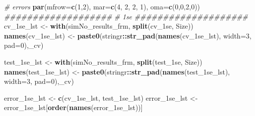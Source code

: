 \documentclass[
]{book}
\newenvironment{Shaded}{\begin{snugshade}}{\end{snugshade}}
\newcommand{\CommentTok}[1]{\textcolor[rgb]{0.56,0.35,0.01}{\textit{#1}}}
\newcommand{\DataTypeTok}[1]{\textcolor[rgb]{0.13,0.29,0.53}{#1}}
\newcommand{\DecValTok}[1]{\textcolor[rgb]{0.00,0.00,0.81}{#1}}
\newcommand{\KeywordTok}[1]{\textcolor[rgb]{0.13,0.29,0.53}{\textbf{#1}}}
\newcommand{\NormalTok}[1]{#1}
\newcommand{\OperatorTok}[1]{\textcolor[rgb]{0.81,0.36,0.00}{\textbf{#1}}}
\newcommand{\StringTok}[1]{\textcolor[rgb]{0.31,0.60,0.02}{#1}}
\begin{document}
\begin{Shaded}
\begin{Highlighting}[]
\CommentTok{\# errors}
\KeywordTok{par}\NormalTok{(}\DataTypeTok{mfrow=}\KeywordTok{c}\NormalTok{(}\DecValTok{1}\NormalTok{,}\DecValTok{2}\NormalTok{), }\DataTypeTok{mar=}\KeywordTok{c}\NormalTok{(}\DecValTok{4}\NormalTok{, }\DecValTok{2}\NormalTok{, }\DecValTok{2}\NormalTok{, }\DecValTok{1}\NormalTok{), }\DataTypeTok{oma=}\KeywordTok{c}\NormalTok{(}\DecValTok{0}\NormalTok{,}\DecValTok{0}\NormalTok{,}\DecValTok{2}\NormalTok{,}\DecValTok{0}\NormalTok{))}
\CommentTok{\#\#\#\#\#\#\#\#\#\#\#\#\#\#\#\#\#\#\#}
\CommentTok{\# 1se}
\CommentTok{\#\#\#\#\#\#\#\#\#\#\#\#\#\#\#\#\#\#\#\#}
\NormalTok{cv\_1se\_lst <{-}}\StringTok{ }\KeywordTok{with}\NormalTok{(simNo\_results\_frm,}
 \KeywordTok{split}\NormalTok{(cv\_1se, Size))}
\KeywordTok{names}\NormalTok{(cv\_1se\_lst) <{-}}\StringTok{ }\KeywordTok{paste0}\NormalTok{(stringr}\OperatorTok{::}\KeywordTok{str\_pad}\NormalTok{(}\KeywordTok{names}\NormalTok{(cv\_1se\_lst), }\DataTypeTok{width=}\DecValTok{3}\NormalTok{, }\DataTypeTok{pad=}\StringTok{\textquotesingle{}0\textquotesingle{}}\NormalTok{),}\StringTok{\textquotesingle{}\_cv\textquotesingle{}}\NormalTok{)}

\NormalTok{test\_1se\_lst <{-}}\StringTok{ }\KeywordTok{with}\NormalTok{(simNo\_results\_frm,}
 \KeywordTok{split}\NormalTok{(test\_1se, Size))}
\KeywordTok{names}\NormalTok{(test\_1se\_lst) <{-}}\StringTok{ }\KeywordTok{paste0}\NormalTok{(stringr}\OperatorTok{::}\KeywordTok{str\_pad}\NormalTok{(}\KeywordTok{names}\NormalTok{(test\_1se\_lst), }\DataTypeTok{width=}\DecValTok{3}\NormalTok{, }\DataTypeTok{pad=}\StringTok{\textquotesingle{}0\textquotesingle{}}\NormalTok{),}\StringTok{\textquotesingle{}\_cv\textquotesingle{}}\NormalTok{)}

\NormalTok{error\_1se\_lst <{-}}\StringTok{ }\KeywordTok{c}\NormalTok{(cv\_1se\_lst, test\_1se\_lst)}
\NormalTok{error\_1se\_lst <{-}}\StringTok{ }\NormalTok{error\_1se\_lst[}\KeywordTok{order}\NormalTok{(}\KeywordTok{names}\NormalTok{(error\_1se\_lst))]}


\end{Highlighting}
\end{Shaded}
\end{document}
